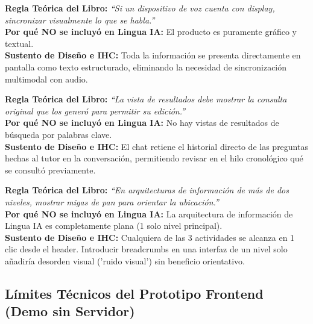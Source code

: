 \documentclass[10pt,a4paper]{article}
\begin{document}
\begin{tcolorbox}[excludedbox, title={C7.4 -- Apoyar la VUI con salida visual cuando haya pantalla \hfill \colorbox{linguaRed}{\scriptsize\textbf{EXCLUIDO}}}]
\small
\textbf{Regla Teórica del Libro:} \textit{``Si un dispositivo de voz cuenta con display, sincronizar visualmente lo que se habla.''}\\
\textbf{Por qué NO se incluyó en Lingua IA:} El producto es puramente gráfico y textual.\\
\textbf{Sustento de Diseño e IHC:} Toda la información se presenta directamente en pantalla como texto estructurado, eliminando la necesidad de sincronización multimodal con audio.
\end{tcolorbox}

\begin{tcolorbox}[excludedbox, title={C7.6 -- Mostrar los términos de búsqueda en los resultados \hfill \colorbox{linguaRed}{\scriptsize\textbf{EXCLUIDO}}}]
\small
\textbf{Regla Teórica del Libro:} \textit{``La vista de resultados debe mostrar la consulta original que los generó para permitir su edición.''}\\
\textbf{Por qué NO se incluyó en Lingua IA:} No hay vistas de resultados de búsqueda por palabras clave.\\
\textbf{Sustento de Diseño e IHC:} El chat retiene el historial directo de las preguntas hechas al tutor en la conversación, permitiendo revisar en el hilo cronológico qué se consultó previamente.
\end{tcolorbox}

\begin{tcolorbox}[excludedbox, title={C7.9 -- Mostrar la ruta de navegación (breadcrumbs) en jerarquías profundas \hfill \colorbox{linguaRed}{\scriptsize\textbf{EXCLUIDO}}}]
\small
\textbf{Regla Teórica del Libro:} \textit{``En arquitecturas de información de más de dos niveles, mostrar migas de pan para orientar la ubicación.''}\\
\textbf{Por qué NO se incluyó en Lingua IA:} La arquitectura de información de Lingua IA es completamente plana (1 solo nivel principal).\\
\textbf{Sustento de Diseño e IHC:} Cualquiera de las 3 actividades se alcanza en 1 clic desde el header. Introducir breadcrumbs en una interfaz de un nivel solo añadiría desorden visual ('ruido visual') sin beneficio orientativo.
\end{tcolorbox}


\subsection*{Límites Técnicos del Prototipo Frontend (Demo sin Servidor)}
\end{document}
